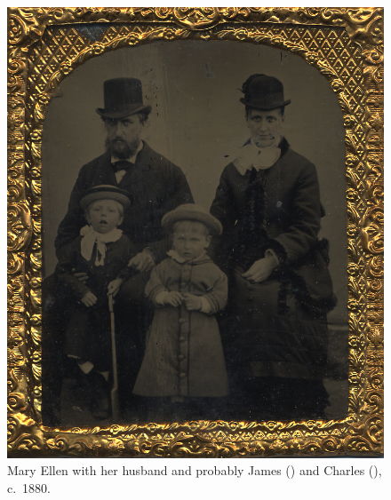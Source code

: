 \begin{figure}
 \centering
 \includegraphics{photos/TH_Barker_with_Mary_Ellen_and_two_children.png}
 \caption{Mary Ellen with her husband and probably James () and Charles (), c.~1880.}
\end{figure}
